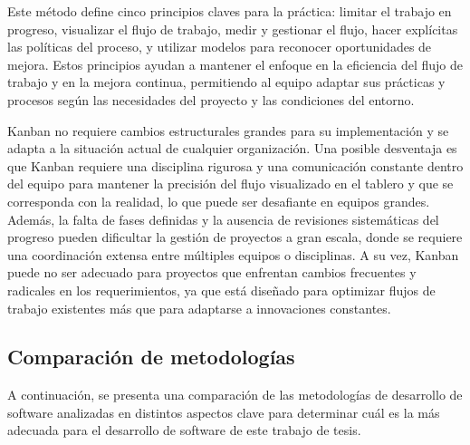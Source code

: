 \documentclass[main.tex]{subfiles}
\begin{document}
Este método define cinco principios claves para la práctica: limitar el trabajo en progreso, visualizar el flujo de trabajo, medir y gestionar el flujo, hacer explícitas las políticas del proceso, y utilizar modelos para reconocer oportunidades de mejora. Estos principios ayudan a mantener el enfoque en la eficiencia del flujo de trabajo y en la mejora continua, permitiendo al equipo adaptar sus prácticas y procesos según las necesidades del proyecto y las condiciones del entorno.

Kanban no requiere cambios estructurales grandes para su implementación y se adapta a la situación actual de cualquier organización. Una posible desventaja es que Kanban requiere una disciplina rigurosa y una comunicación constante dentro del equipo para mantener la precisión del flujo visualizado en el tablero y que se corresponda con la realidad, lo que puede ser desafiante en equipos grandes. Además, la falta de fases definidas y la ausencia de revisiones sistemáticas del progreso pueden dificultar la gestión de proyectos a gran escala, donde se requiere una coordinación extensa entre múltiples equipos o disciplinas. A su vez, Kanban puede no ser adecuado para proyectos que enfrentan cambios frecuentes y radicales en los requerimientos, ya que está diseñado para optimizar flujos de trabajo existentes más que para adaptarse a innovaciones constantes.

\subsection{Comparación de metodologías}

A continuación, se presenta una comparación de las metodologías de desarrollo de software analizadas en distintos aspectos clave para determinar cuál es la más adecuada para el desarrollo de software de este trabajo de tesis.
\end{document}
